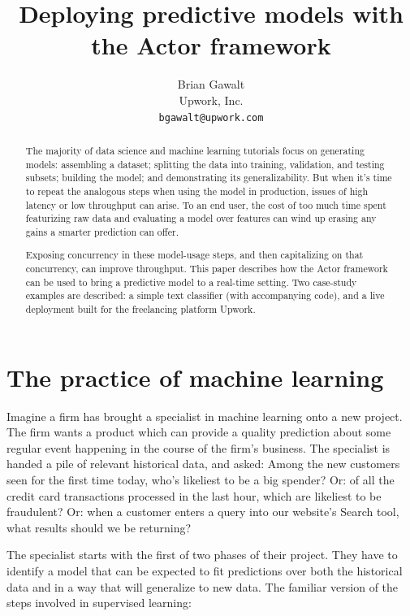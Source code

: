\documentclass{article}
\begin{document}
\title{Deploying predictive models with the Actor framework}
\author{Brian Gawalt \\
Upwork, Inc. \\
\texttt{bgawalt@upwork.com}
}

\maketitle

\begin{abstract}
The majority of data science and machine learning tutorials focus on generating models: assembling a dataset; splitting the data into training, validation, and testing subsets; building the model; and demonstrating its generalizability. But when it's time to repeat the analogous steps when using the model in production, issues of high latency or low throughput can arise. To an end user, the cost of too much time spent featurizing raw data and evaluating a model over features can wind up erasing any gains a smarter prediction can offer. 

Exposing concurrency in these model-usage steps, and then capitalizing on that concurrency, can improve throughput. This paper describes how the Actor framework can be used to bring a predictive model to a real-time setting. Two case-study examples are described: a simple text classifier (with accompanying code), and a live deployment built for the freelancing platform Upwork.
\end{abstract}

\section{The practice of machine learning}

Imagine a firm has brought a specialist in machine learning onto a new project. The firm wants a product which can provide a quality prediction about some regular event happening in the course of the firm's business. The specialist is handed a pile of relevant historical data, and asked: Among the new customers seen for the first time today, who's likeliest to be a big spender? Or: of all the credit card transactions processed in the last hour, which are likeliest to be fraudulent? Or: when a customer enters a query into our website's Search tool, what results should we be returning?

The specialist starts with the first of two phases of their project. They have to identify a model that can be expected to fit predictions over both the historical data and in a way that will generalize to new data. The familiar version of the steps involved in supervised learning: 
\end{document}

